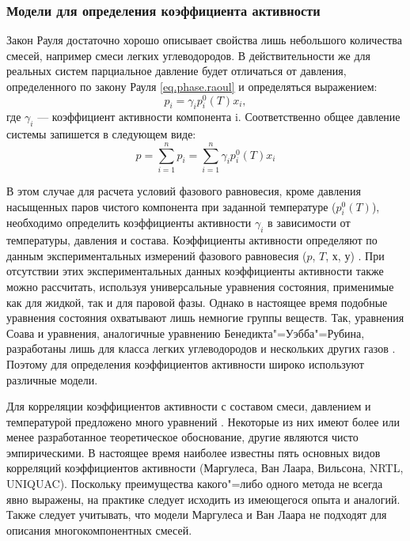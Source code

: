 \subsubsection*{Модели для определения коэффициента активности}
Закон Рауля достаточно хорошо описывает свойства лишь небольшого количества смесей, например смеси легких углеводородов. В действительности же для реальных систем парциальное давление будет отличаться от давления, определенного по закону Рауля \eqref{eq.phase.raoul} и определяться выражением:
\begin{equation}
p_i=\gamma_i p_i^0(T) x_i,
\end{equation}
где  $\gamma_i$ --- коэффициент активности компонента i. Соответственно общее давление системы запишется в следующем виде:
\begin{equation} \label{eq.phase.pressgam}
p=\sum\limits_{i=1}^{n} p_i=\sum\limits_{i=1}^{n} \gamma_i p_i^0(T) x_i
\end{equation}

В этом случае для расчета условий фазового равновесия, кроме давления насыщенных паров чистого компонента при заданной температуре ($p_i^0(T)$), необходимо определить коэффициенты активности $\gamma_i$ в зависимости от температуры, давления и состава.
Коэффициенты активности определяют по данным экспериментальных измерений фазового равновесия ($p$, $T$, $х$, $у$) \cite{kogan1,kogan2} . При отсутствии этих экспериментальных данных коэффициенты активности также можно рассчитать, используя универсальные уравнения состояния, применимые как для жидкой, так и для паровой фазы. Однако в настоящее время подобные уравнения состояния охватывают лишь немногие группы веществ. Так, уравнения Соава и уравнения, аналогичные уравнению Бенедикта"=Уэбба"=Рубина, разработаны лишь для класса легких углеводородов и нескольких других газов \cite{rid1982}. Поэтому для определения коэффициентов активности широко используют различные модели.

Для корреляции коэффициентов активности с составом смеси, давлением и температурой предложено много уравнений \cite{rid1982,yelles1989}. Некоторые из них имеют более или менее разработанное теоретическое обоснование, другие являются чисто эмпирическими. В настоящее время наиболее известны пять основных видов корреляций коэффициентов активности (Маргулеса, Ван Лаара, Вильсона, NRTL, UNIQUAC). Поскольку преимущества какого"=либо одного метода не всегда явно выражены, на практике следует исходить из имеющегося опыта и аналогий. Также следует учитывать, что модели Маргулеса и Ван Лаара не подходят для описания многокомпонентных смесей.


